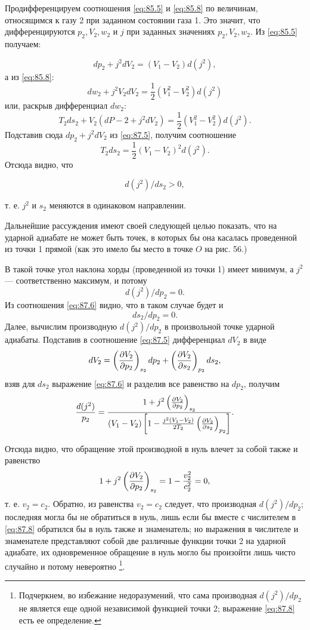 Продифференцируем соотношения \ref{eq:85.5} и \ref{eq:85.8} по величинам,
относящимся к газу 2 при заданном состоянии газа 1. Это значит, что
дифференцируются $p_2, V_2, w_2$ и $j$ при заданных значениях $p_2, V_2, w_2$. Из
\ref{eq:85.5} получаем:

\begin{equation}
	\label{eq:87.5}
	dp_2 + j^2 dV_2 = (V_1 - V_2) d(j^2),
\end{equation}
а из \ref{eq:85.8}:
\[
	dw_2 + j^2 V_2 dV_2 = \frac{1}{2}(V_1^2 - V_2^2) d(j^2)
\]
или, раскрыв дифференциал $dw_2$:
\[
T_2 ds_2 + V_2 (dP-2 + j^2 dV_2) = \frac{1}{2}(V^2_1 - V^2_2) d(j^2).
\]
Подставив сюда $dp_2 + j^2 dV_2$ из \ref{eq:87.5}, получим соотношение
\begin{equation}
	\label{eq:87.6}
	T_2 ds_2 = \frac{1}{2} (V_1 - V_2)^2 d(j^2).
\end{equation}
Отсюда видно, что

\begin{equation}
	\label{eq:87.7}
	d(j^2)/ds_2 > 0,
\end{equation}

т. е. $j^2$ и $s_2$ меняются в одинаковом направлении.

Дальнейшие рассуждения имеют своей следующей целью показать, что на ударной
адиабате не может быть точек, в которых бы она касалась проведенной из точки 1
прямой (как это имело бы место в точке $O$ на рис. 56.)

В такой точке угол наклона хорды (проведенной из точки 1) имеет минимум, а $j^2$ —
соответственно максимум, и потому
\[
	d(j^2)/dp_2 = 0.
\]
Из соотношения \ref{eq:87.6} видно, что в таком случае будет и 
\[
	ds_2/dp_2 = 0.
\]
Далее, вычислим производную $d(j^2)/dp_2$ в произвольной точке ударной
адиабаты. Подставив в соотношение \ref{eq:87.5} дифференциал $dV_2$ в виде
\[
	dV_2 = \left( \frac{\partial{V_2}}{\partial{p_2}} \right)_{s_2}dp_2 + \left( \frac{\partial{V_2}}{\partial{s_2}} \right)_{p_2}ds_2,
\]
взяв для $ds_2$ выражение \ref{eq:87.6} и разделив все равенство на $dp_2$, получим
\begin{equation}
	\label{eq:87.8}
	\frac{d(j^2)}{p_2} = \frac{1 + j^2 \left( \frac{\partial{V_2}}{\partial{p_2}} \right)_{s_2}}{(V_1 - V_2) \left\lbrack 1 - \frac{j^2(V_1-V_2)}{2T_2} \left( \frac{\partial{V_2}}{\partial{s_2}} \right)_{p_2} \right\rbrack}.
\end{equation}

Отсюда видно, что обращение этой производной в нуль влечет за собой также и
равенство
\[
	1 + j^2 \left( \frac{\partial{V_2}}{\partial{p_2}} \right)_{s_2} = 1 - \frac{v^2_2}{c^2_2} = 0,
\]
т. е. $v_2 = c_2$. Обратно, из равенства $v_2 = c_2$ следует, что производная
$d(j^2)/dp_2$; последняя могла бы не обратиться в нуль, лишь если бы вместе с
числителем в \ref{eq:87.8} обратился бы в нуль также и знаменатель; но
выражения в числителе и знаменателе представляют собой две различные функции
точки 2 на ударной адиабате, их одновременное обращение в нуль могло бы
произойти лишь чисто случайно и потому невероятно \footnote{Подчеркнем, во
избежание недоразумений, что сама производная $d(j^2)/dp_2$ не является еще
одной независимой функцией точки 2; выражение \ref{eq:87.8} есть ее
определение.}.

